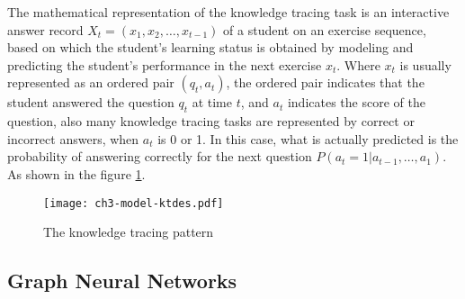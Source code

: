 The mathematical representation of the knowledge tracing task is an interactive answer record \(X_t=(x_1,x_2,\ldots,x_{t-1})\) of a student on an exercise sequence, based on which the student's learning status is obtained by modeling and predicting the student's performance in the next exercise \(x_{t}\). Where \(x_t\) is usually represented as an ordered pair \((q_t,a_t)\), the ordered pair indicates that the student answered the question \(q_t\) at time \(t\), and \(a_t\) indicates the score of the question, also many knowledge tracing tasks are represented by correct or incorrect answers, when \(a_t\) is 0 or 1. In this case, what is actually predicted is the probability of answering correctly for the next question \(P(a_{t}=1|a_{t-1},\ldots,a_1)\). As shown in the figure \figurename{\ref{fig:ch3-model-ktdes}}.

\begin{figure}
	\texttt{[image: ch3-model-ktdes.pdf]}
	\caption{The knowledge tracing pattern}\label{fig:ch3-model-ktdes}
\end{figure}

\subsection{Graph Neural Networks}

